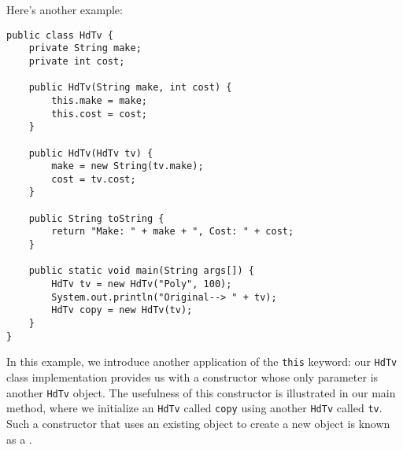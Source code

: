 Here's another example:

\begin{lstlisting}
public class HdTv {
    private String make;
    private int cost;
    
    public HdTv(String make, int cost) {
        this.make = make;
        this.cost = cost;
    }
    
    public HdTv(HdTv tv) {
        make = new String(tv.make);
        cost = tv.cost;
    }
    
    public String toString {
        return "Make: " + make + ", Cost: " + cost;
    }
    
    public static void main(String args[]) {
        HdTv tv = new HdTv("Poly", 100);
        System.out.println("Original--> " + tv);
        HdTv copy = new HdTv(tv);
    }
}
\end{lstlisting}

In this example, we introduce another application of the \verb!this! keyword: our \verb!HdTv! class implementation provides us with a constructor whose only parameter is another \verb!HdTv! object. The usefulness of this constructor is illustrated in our main method, where we initialize an \verb!HdTv! called \verb!copy! using another \verb!HdTv! called \verb!tv!. Such a constructor that uses an existing object to create a new object is known as a .